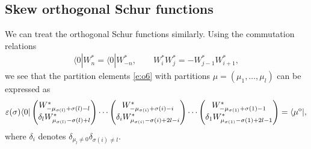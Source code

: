 \documentclass[10pt,a4paper]{amsart}
\numberwithin{equation}{section}
\begin{document}
\subsection{Skew orthogonal Schur functions} We can treat the orthogonal Schur functions similarly. Using the commutation relations
\begin{align*}
\langle 0|W^*_n=\langle 0|W^*_{-n},\qquad W^*_iW^*_j=-W^*_{j-1}W^*_{i+1},
\end{align*}
we see that the partition elements \eqref{e:o6} with partitions $\mu=(\mu_1,\dots,\mu_l)$ can be expressed as
\begin{gather}\label{e:o9}
\varepsilon(\sigma)\langle 0|\begin{pmatrix}{W^*_{-\mu_{\sigma(l)}+\sigma(l)-l}}\\{\delta_lW^*_{\mu_{\sigma(l)}-\sigma(l)+l}}\end{pmatrix}\cdots \begin{pmatrix}{W^*_{-\mu_{\sigma(i)}+\sigma(i)-i}}\\{\delta_iW^*_{\mu_{\sigma(i)}-\sigma(i)+2l-i}}\end{pmatrix}\cdots \begin{pmatrix}{W^*_{-\mu_{\sigma(1)}+\sigma(1)-1}}\\{\delta_1W^*_{\mu_{\sigma(1)}-\sigma(1)+2l-1}}\end{pmatrix}=\langle\mu^{\rm o}|,
\end{gather}
where $\delta_i$ denotes $\delta_{\mu_l\neq 0}\delta_{\sigma(i)\neq l}$.
\end{document}
